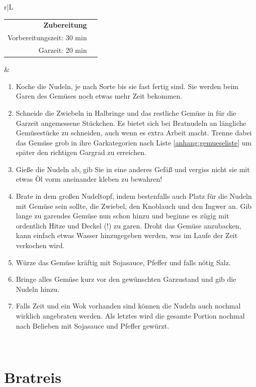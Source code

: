 \documentclass[a4paper, 12pt]{scrbook} 								%
\numberwithin{equation}{section} 									%
\begin{document}
		\newpage
		\begin{tabularx}{\textwidth}{r|L}
		
		
		\begin{tabular}[t]{rr}
			\textbf{Zubereitung}	\\
			\small Vorbereitungszeit: 30 min	\\
			\small Garzeit:	20 min		\\
		\end{tabular}			&	\begin{enumerate}[]
										\item Koche die Nudeln, je nach Sorte bis sie fast fertig sind. Sie werden beim Garen des Gemüses noch etwas mehr Zeit bekommen.
										\item Schneide die Zwiebeln in Halbringe und das restliche Gemüse in für die Garzeit angemessene Stückchen. Es bietet sich bei Bratnudeln an längliche Gemüsestücke zu schneiden, auch wenn es extra Arbeit macht. Trenne dabei das Gemüse grob in ihre Garkategorien nach Liste \ref{anhang:gemueseliste} um später den richtigen Gargrad zu erreichen.
										\item Gieße die Nudeln ab, gib Sie in eine anderes Gefäß und vergiss nicht sie mit etwas Öl vorm aneinander kleben zu bewahren! 
										\item Brate in dem großen Nudeltopf, indem bestenfalls auch Platz für die Nudeln mit Gemüse sein sollte, die Zwiebel, den Knoblauch und den Ingwer an. Gib lange zu garendes Gemüse nun schon hinzu und beginne es zügig mit ordentlich Hitze und Deckel (!) zu garen. Droht das Gemüse anzubacken, kann einfach etwas Wasser hinzugegeben werden, was im Laufe der Zeit verkochen wird.
										\item Würze das Gemüse kräftig mit Sojasauce, Pfeffer und falls nötig Salz.
										\item Bringe alles Gemüse kurz vor den gewünschten Garzustand und gib die Nudeln hinzu.
										\item Falls Zeit und ein Wok vorhanden sind können die Nudeln auch nochmal wirklich angebraten werden. Als letztes wird die gesamte Portion nochmal nach Belieben mit Sojasauce und Pfeffer gewürzt.
									\end{enumerate}	\\
	\end{tabularx}
	\newpage


	\section{Bratreis}	\label{bratreis}
\end{document}
